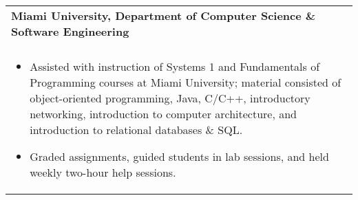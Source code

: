 \documentclass[letterpaper,10pt]{article} %
\begin{document}
\begin{tabular*}{\linewidth}{@{\extracolsep{\fill}} lr }
\textbf{Miami University, Department of Computer Science \& Software Engineering} & \scriptsize\bfseries\color{sectioncolour}{Oxford, OH}\\
\footnotesize\bfseries\color{sectioncolour}{Teaching Assistant} & \scriptsize\bfseries\color{sectioncolour}{August 2022 - December 2023}\\
\multicolumn{2}{p{\linewidth}}{
    \scriptsize{\vspace{-0.1in}\begin{itemize}
        \item Assisted with instruction of Systems 1 and Fundamentals of Programming courses at Miami University; material consisted of object-oriented programming, Java, C/C++, introductory networking, introduction to computer architecture, and introduction to relational databases \& SQL.
        \item Graded assignments, guided students in lab sessions, and held weekly two-hour help sessions.
    \end{itemize}\vspace{-0.1in}}
}\\


\end{tabular*}
\end{document}
